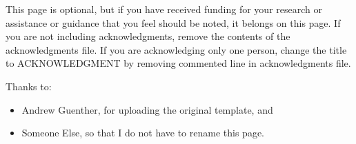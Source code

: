 
\begin{acknowledgments}

    This page is optional, but if you have received funding for your research or assistance or guidance that you feel should be noted, it belongs on this page. If you are not including acknowledgments, remove the contents of the acknowledgments file. If you are acknowledging only one person, change the title to ACKNOWLEDGMENT by removing commented line in acknowledgments file.

    Thanks to:
    \begin{itemize}
        \item Andrew Guenther, for uploading the original template, and
        \item Someone Else, so that I do not have to rename this page.
    \end{itemize}
\end{acknowledgments}
